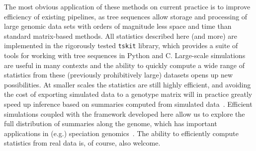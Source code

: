 \documentclass[9pt,twoside,lineno]{gsajnl}
\newcommand{\tskit}{{\texttt{tskit}}}
\begin{document}
The most obvious application of these methods on current practice
is to improve efficiency of existing pipelines,
as tree sequences allow storage and processing of large genomic data sets
with orders of magnitude less space and time than standard matrix-based methods.
All statistics described here (and more) are implemented
in the rigorously tested \tskit{} library,
which provides a suite of tools for working with tree sequences in Python and C.
Large-scale simulations are useful in many contexts
\citep[e.g.,][]{martin2017human,browning2018one,galloway2019stickleback}
and the ability to quickly compute a wide range of statistics from
these (previously prohibitively large) datasets opens up new possibilities.
At smaller scales the statistics are still highly efficient, and avoiding
the cost of exporting simulated data to a genotype matrix will in practice greatly
speed up inference based on summaries computed from simulated
data~\citep{beaumont2002approximate,csillery2010approximate,schrider2018supervised}.
Efficient simulations coupled with the framework developed here allow us to
explore the full distribution of summaries along the genome, which has
important applications in (e.g.) speciation genomics~\citep{lohse2017come}.
The ability to efficiently compute statistics from real data is, of course, also welcome.
\end{document}
